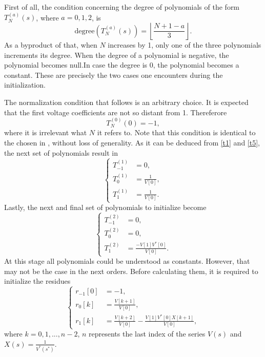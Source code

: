 \documentclass[conference]{IEEEtran}
\begin{document}
First of all, the condition concerning the degree of polynomials of the form $T^{(a)}_N(s)$, where $a=0,1,2$, is
\begin{equation}
  \text{degree}\left(T^{(a)}_N(s)\right)=\left\lfloor\frac{N+1-a}{3}\right\rfloor.
  \label{t5}
\end{equation}
As a byproduct of that, when $N$ increases by 1, only one of the three polynomials increments its degree. When the degree of a polynomial is negative, the polynomial becomes null.In case the degree is 0, the polynomial becomes a constant. These are precisely the two cases one encounters during the initialization.

The normalization condition that follows is an arbitrary choice. It is expected that the first voltage coefficients are not so distant from 1. Thereferore
\begin{equation}
  T^{(0)}_N(0)=-1,
  \label{t6}
\end{equation}
where it is irrelevant what $N$ it refers to. Note that this condition is identical to the chosen in \cite{Trias2018}, without loss of generality. As it can be deduced from \eqref{t1} and \eqref{t5}, the next set of polynomials result in
\begin{equation}
  \begin{cases}
    T^{(1)}_{-1}&=0,\\
    T^{(1)}_{0}&=\frac{1}{V[0]},\\
    T^{(1)}_{1}&=\frac{1}{V[0]}.
  \end{cases}
  \label{t7}
\end{equation}
Lastly, the next and final set of polynomials to initialize become
\begin{equation}
  \begin{cases}
    T^{(2)}_{-1}&=0,\\
    T^{(2)}_{0}&=0,\\
    T^{(2)}_{1}&=\frac{-V[1]V^*[0]}{V[0]}.
  \end{cases}
  \label{t8}
\end{equation}
At this stage all polynomials could be understood as constants. However, that may not be the case in the next orders. Before calculating them, it is required to initialize the residues
\begin{equation}
  \begin{cases}
   r_{-1}[0]&=-1,\\ 
   r_0[k]&=\frac{V[k+1]}{V[0]},\\
   r_1[k]&=\frac{V[k+2]}{V[0]}-\frac{V[1]V^*[0]X[k+1]}{V[0]},
  \end{cases}
  \label{t9}
\end{equation}
where $k=0,1,...,n-2$, $n$ represents the last index of the series $V(s)$ and $X(s)=\frac{1}{V^*(s^*)}$.
\end{document}
